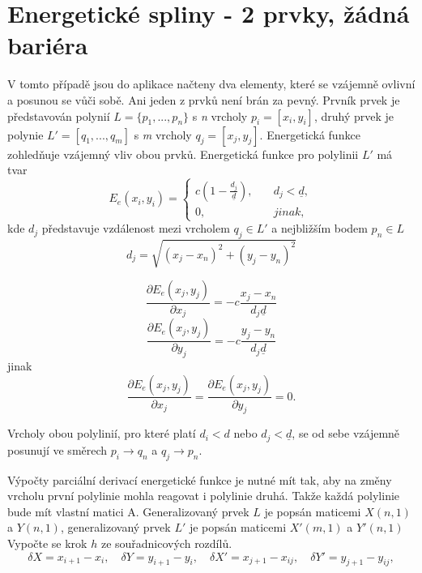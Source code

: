 \documentclass[oneside,12pt,a4paper]{book}
\begin{document}
\section{Energetické spliny - 2 prvky, žádná bariéra}
V tomto případě jsou do aplikace načteny dva elementy, které se vzájemně ovlivní a posunou se vůči sobě. Ani jeden z prvků není brán za pevný. Prvník prvek je představován polynií $L = \{p_1,...,p_n\}$ s \emph{n} vrcholy $p_i = [x_i,y_i]$, druhý prvek je polynie $L' = [q_1,...,q_m]$ s \emph{m} vrcholy $q_j = [x_j,y_j]$. Energetická funkce zohledňuje vzájemný vliv obou prvků. Energetická funkce pro polylinii $L'$ má tvar
\begin{equation}
 E_e(x_i,y_i) =
  \begin{cases}
    c(1-\frac{d_j}{\underline{d}}),       & \quad d_j<\underline{d},\\
    0,  & \quad jinak,
  \end{cases}
\end{equation}
kde $d_j$ představuje vzdálenost mezi vrcholem $q_j \in L'$ a nejbližším bodem $p_n \in L$ 
\begin{equation}
d_j = \sqrt{(x_j-x_n)^2 + (y_j-y_n)^2}
\end{equation}

\begin{equation}
 \frac{\partial E_e(x_j,y_j)}{\partial x_j} = -c\frac{x_j-x_n}{d_j\underline{d}}
\end{equation}
\begin{equation}
\frac{\partial E_e(x_j,y_j)}{\partial y_j} = -c\frac{y_j-y_n}{d_j\underline{d}}
\end{equation}
jinak
\begin{equation}
 \frac{\partial E_e(x_j,y_j)}{\partial x_j} = \frac{\partial E_e(x_j,y_j)}{\partial y_j} = 0.
\end{equation}

Vrcholy obou polylinií, pro které platí $d_i < d$ nebo $d_j < \underline{d}$, se od sebe vzájemně posunují ve směrech 
$p_i \rightarrow q_n$ a $q_j \rightarrow p_n$.

Výpočty parciální derivací energetické funkce je nutné mít tak, aby na změny vrcholu první polylinie mohla reagovat i polylinie druhá. Takže každá polylinie bude mít vlastní matici A. Generalizovaný prvek $L$ je popsán maticemi $X(n,1)$ a $Y(n,1)$, generalizovaný prvek $L'$ je popsán maticemi $X'(m,1)$ a $Y'(n,1)$
Vypočte se krok $h$ ze souřadnicových rozdílů.
\begin{equation}
\delta X = x_{i+1}-x_i,\quad \delta Y = y_{i+1}-y_i, \quad \delta X' = x_{j+1}-x_{ij},\quad \delta Y' = y_{j+1}-y_{ij},
\end{equation}
\end{document}
